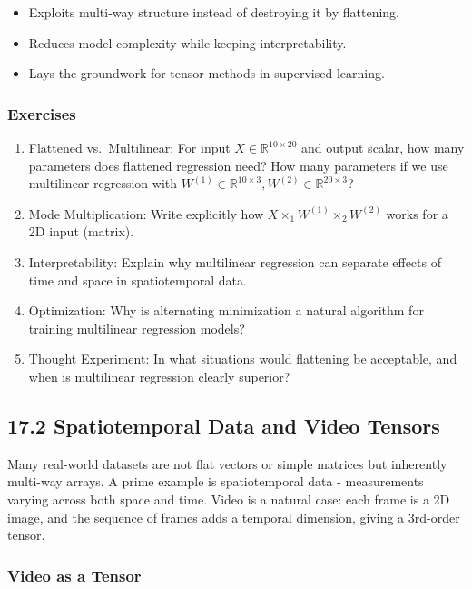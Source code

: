 \documentclass[
  letterpaper,
  DIV=11,
  numbers=noendperiod]{scrreprt}
\providecommand{\tightlist}{%
  \setlength{\itemsep}{0pt}\setlength{\parskip}{0pt}}
\begin{document}
\begin{itemize}
\tightlist
\item
  Exploits multi-way structure instead of destroying it by flattening.
\item
  Reduces model complexity while keeping interpretability.
\item
  Lays the groundwork for tensor methods in supervised learning.
\end{itemize}

\subsubsection{Exercises}\label{exercises-59}

\begin{enumerate}
\def\labelenumi{\arabic{enumi}.}
\item
  Flattened vs.~Multilinear: For input
  \(X \in \mathbb{R}^{10 \times 20}\) and output scalar, how many
  parameters does flattened regression need? How many parameters if we
  use multilinear regression with
  \(W^{(1)} \in \mathbb{R}^{10 \times 3}, W^{(2)} \in \mathbb{R}^{20 \times 3}\)?
\item
  Mode Multiplication: Write explicitly how
  \(X \times_1 W^{(1)} \times_2 W^{(2)}\) works for a 2D input (matrix).
\item
  Interpretability: Explain why multilinear regression can separate
  effects of time and space in spatiotemporal data.
\item
  Optimization: Why is alternating minimization a natural algorithm for
  training multilinear regression models?
\item
  Thought Experiment: In what situations would flattening be acceptable,
  and when is multilinear regression clearly superior?
\end{enumerate}

\subsection{17.2 Spatiotemporal Data and Video
Tensors}\label{spatiotemporal-data-and-video-tensors}

Many real-world datasets are not flat vectors or simple matrices but
inherently multi-way arrays. A prime example is spatiotemporal data -
measurements varying across both space and time. Video is a natural
case: each frame is a 2D image, and the sequence of frames adds a
temporal dimension, giving a 3rd-order tensor.

\subsubsection{Video as a Tensor}\label{video-as-a-tensor}
\end{document}
